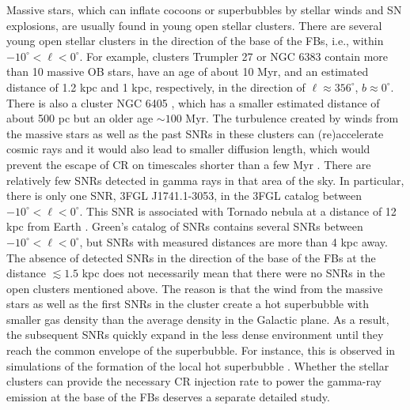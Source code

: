 Massive stars, which can inflate cocoons or superbubbles by stellar winds and SN explosions, are usually found in young open stellar clusters.
There are several young open stellar clusters in the direction of the base of the FBs, i.e., within $-10^\circ < \ell  < 0^\circ$.
For example, clusters Trumpler 27 \citep{1977ApJ...215..106M} or NGC 6383 \citep{1978MNRAS.184..661L}
contain more than 10 massive OB stars, have an age of about 10 Myr, and an estimated distance of 1.2 kpc and 1 kpc, respectively,
in the direction of $\ell \approx 356^\circ$, $b \approx 0^\circ$.
There is also a cluster NGC 6405 \citep{1959ZA.....47...15R}, which has a smaller estimated distance of about 500 pc
but an older age $\sim 100$ Myr.
The turbulence created by winds from the massive stars as well as the past SNRs in these clusters can (re)accelerate cosmic rays and
it would also lead to smaller diffusion length, which would prevent the escape of CR on timescales shorter than a few Myr \citep{2011Sci...334.1103A}.
There are relatively few SNRs detected in gamma rays in that area of the sky.
In particular, there is only one SNR, 3FGL J1741.1-3053, in the 3FGL catalog \citep{2015ApJS..218...23A}
between $-10^\circ < \ell  < 0^\circ$.
This SNR is associated with Tornado nebula at a distance of 12 kpc from Earth \citep{2013ApJ...774...36C}.
Green's catalog of SNRs \citep{2014BASI...42...47G, 2017Green} contains several SNRs between $-10^\circ < \ell  < 0^\circ$,
but SNRs with measured distances are more than 4 kpc away.
The absence of detected SNRs in the direction of the base of the FBs at the distance $\lesssim 1.5$ kpc 
does not necessarily mean that there were no SNRs in the open clusters mentioned above.
The reason is that the wind from the massive stars as well as the first SNRs in the cluster create a hot superbubble
with smaller gas density than the average density in the Galactic plane. As a result, the subsequent SNRs quickly expand
in the less dense environment until they reach the common envelope of the superbubble.
For instance, this is observed in simulations of the formation of the local hot superbubble
\citep{2016Natur.532...73B, 2017A&A...604A..81S, 2018Galax...6...26S}.
Whether the stellar clusters can provide the necessary CR injection rate to power the gamma-ray emission at the base
of the FBs deserves a separate detailed study.

